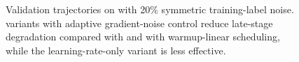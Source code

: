 \begin{figure}[t]
    \centering
    \caption[
        Validation trajectories on \agnews{} with 20\% symmetric label noise
    ]{
        Validation trajectories on \agnews{} with 20\% symmetric training-label noise. \method{} variants with adaptive gradient-noise control reduce late-stage degradation compared with \adamw{} and \adamw{} with warmup-linear scheduling, while the learning-rate-only variant is less effective.
    }
    \label{fig:agnews-noisy-curves}
\end{figure}